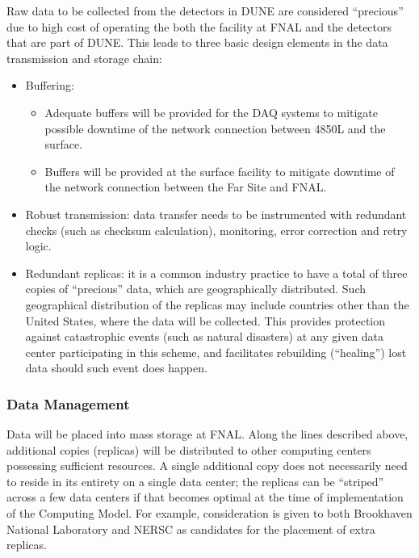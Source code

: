 Raw data to be collected from the detectors in DUNE are considered ``precious'' due to high cost of operating the both the facility at FNAL
and the detectors that are part of DUNE. This leads to three basic design elements in the data transmission and storage chain:
\begin{itemize}
\item Buffering:
\begin{itemize}
\item Adequate buffers will be provided for the DAQ systems  to mitigate possible downtime of the network connection between 4850L and the surface.
\item Buffers will be provided at the surface facility to mitigate downtime of the network connection between the Far Site and FNAL.
\end{itemize}
\item Robust transmission: data transfer needs to be instrumented with redundant checks (such as checksum calculation), monitoring, error correction and retry logic.
\item Redundant replicas: it is a common industry practice to have a total of three copies of ``precious'' data, which are geographically distributed.
Such geographical distribution of the replicas may include countries other than the United States, where the data will be collected.
This provides protection against catastrophic events (such as natural disasters) at any given data center participating in this scheme, and facilitates rebuilding (``healing'')  lost data should such event does happen.
\end{itemize}


\subsubsection{Data Management}
\label{sec:detectors-sc-infrastructure-computing-model-data-mgt}

Data will be placed into mass storage at FNAL. Along the lines described above, additional copies (replicas) will be distributed to other
computing centers possessing sufficient resources.
A single additional copy does not necessarily need to reside in its entirety on a single data center; the replicas can be ``striped'' across a few data centers if that
becomes optimal at the time of implementation of the Computing Model. For example, consideration is given to both Brookhaven National Laboratory
and NERSC as candidates for the placement of extra replicas.

